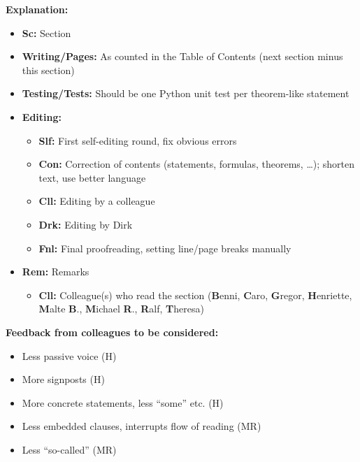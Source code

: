 \clearpage

\noindent
\textbf{Explanation:}

\begin{itemize}
  \item
  \textbf{Sc:}
  Section
  
  \item
  \textbf{Writing/Pages:}
  As counted in the Table of Contents
  (next section minus this section)
  
  \item
  \textbf{Testing/Tests:}
  Should be one Python unit test per theorem-like statement
  
  \item
  \textbf{Editing:}
  \begin{itemize}
    \item
    \textbf{Slf:}
    First self-editing round, fix obvious errors
    
    \item
    \textbf{Con:}
    Correction of contents (statements, formulas, theorems, \dots);
    shorten text, use better language
    
    \item
    \textbf{Cll:}
    Editing by a colleague
    
    \item
    \textbf{Drk:}
    Editing by Dirk
    
    \item
    \textbf{Fnl:}
    Final proofreading, setting line/page breaks manually
  \end{itemize}
  
  \item
  \textbf{Rem:}
  Remarks
  \begin{itemize}
    \item
    \textbf{Cll:}
    Colleague(s) who read the section
    (\textbf{B}enni,
    \textbf{C}aro,
    \textbf{G}regor,
    \textbf{H}enriette,
    \textbf{M}alte \textbf{B}.,
    \textbf{M}ichael \textbf{R}.,
    \textbf{R}alf,
    \textbf{T}heresa)
  \end{itemize}
\end{itemize}

\noindent
\textbf{Feedback from colleagues to be considered:}

\begin{itemize}
  \item
  Less passive voice (H)
  
  \item
  More signposts (H)
  
  \item
  More concrete statements, less ``some'' etc. (H)
  
  \item
  Less embedded clauses, interrupts flow of reading (MR)
  
  \item
  Less ``so-called'' (MR)
\end{itemize}

\cleardoublepage
